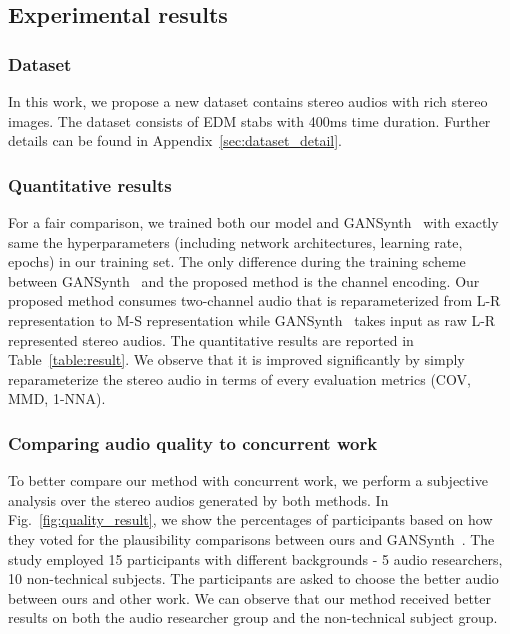 \subsection{Experimental results}
\label{subsec:result}
\subsubsection{Dataset}
\label{subsubsec:dataset}
In this work, we propose a new dataset contains stereo audios with rich stereo images. The dataset consists of EDM stabs with 400ms time duration. Further details can be found in Appendix~\ref{sec:dataset_detail}. 
\fi

\subsubsection{Quantitative results}
\label{subsubsec:result}

For a fair comparison, we trained both our model and GANSynth~\cite{gansynth} with exactly same the hyperparameters (including network architectures, learning rate, epochs) in our training set. The only difference during the training scheme between GANSynth~\cite{gansynth} and the proposed method is the channel encoding. Our proposed method consumes two-channel audio that is reparameterized from L-R representation to M-S representation while GANSynth~\cite{gansynth} takes input as raw L-R represented stereo audios. The quantitative results are reported in Table~\ref{table:result}. We observe that it is improved significantly by simply reparameterize the stereo audio in terms of every evaluation metrics (COV, MMD, 1-NNA).

\subsubsection{Comparing audio quality to concurrent work}
\label{subsubsec:audio_quality}

To better compare our method with concurrent work, we perform a subjective analysis over the stereo audios generated by both methods. In Fig.~\ref{fig:quality_result}, we show the percentages of participants based on how they voted for the plausibility comparisons between ours and GANSynth~\cite{gansynth}. The study employed 15 participants with different backgrounds - 5 audio researchers, 10 non-technical subjects. The participants are asked to choose the better audio between ours and other work. We can observe that our method received better results on both the audio researcher group and the non-technical subject group.